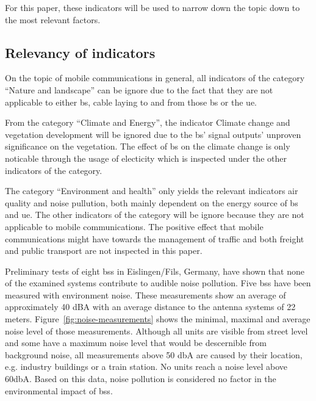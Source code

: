 \documentclass[11pt,a4paper]{article}
\begin{document}
For this paper, these indicators will be used to narrow down the topic down to the most relevant factors.

\subsection{Relevancy of indicators}\label{subsec:relevancy}

On the topic of mobile communications in general, all indicators of the category \enquote{Nature and landscape} can be ignore due to the fact that they are not applicable to either \acrshort{bs}, cable laying to and from those \acrshort{bs} or the \acrshort{ue}.

From the category \enquote{Climate and Energy}, the indicator Climate change and vegetation development will be ignored due to the \acrshort{bs}' signal outputs' unproven significance on the vegetation.
The effect of \acrshort{bs} on the climate change is only noticable through the usage of electicity which is inspected under the other indicators of the category.

The category \enquote{Environment and health} only yields the relevant indicators air quality and noise pullution, both mainly dependent on the energy source of \acrshort{bs} and \acrshort{ue}.
The other indicators of the category will be ignore because they are not applicable to mobile communications.
The positive effect that mobile communications might have towards the management of traffic and both freight and public transport are not inspected in this paper.

Preliminary tests of eight \acrlong{bs}s in Eislingen/Fils, Germany, have shown that none of the examined systems contribute to audible noise pollution.
Five \acrshort{bs}s have been measured with environment noise.
These measurements show an average of approximately 40 dBA with an average distance to the antenna systems of 22 meters.
Figure~\ref{fig:noise-measurements} shows the minimal, maximal and average noise level of those measurements.
Although all units are visible from street level and some have a maximum noise level that would be descernible from background noise, all measurements above 50 dbA are caused by their location, e.g. industry buildings or a train station.
No units reach a noise level above 60dbA.
Based on this data, noise pollution is considered no factor in the environmental impact of \acrlong{bs}s.

\noiseData
\end{document}
